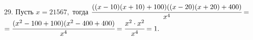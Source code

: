 29. Пусть $x=21567,$ тогда $\cfrac{((x-10)(x+10)+100)((x-20)(x+20)+400)}{x^4}=$\\$=\cfrac{(x^2-100+100)(x^2-400+400)}{x^4}=
\cfrac{x^2\cdot x^2 }{x^4}=1.$\\
